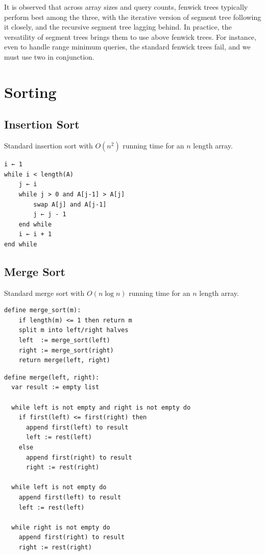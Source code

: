 \documentclass[12pt]{article}
\begin{document}
It is observed that across array sizes and query counts, fenwick trees typically perform best among the three, with the iterative version of segment tree following it closely, and the recursive segment tree lagging behind.  
In practice, the versatility of segment trees brings them to use above fenwick trees. For instance, even to handle range minimum queries, the standard fenwick trees fail, and we must use two in conjunction.\cite{fenwick_tree_rmq}


\section{Sorting}\label{sec:sorting-detail}

\subsection{Insertion Sort\cite{insertion_sort_wiki}}
Standard insertion sort with $O(n^2)$ running time for an $n$ length array.
\begin{verbatim}
i ← 1
while i < length(A)
    j ← i
    while j > 0 and A[j-1] > A[j]
        swap A[j] and A[j-1]
        j ← j - 1
    end while
    i ← i + 1
end while
\end{verbatim}

\subsection{Merge Sort\cite{merge_sort_wiki}}
Standard merge sort with $O(n\log n)$ running time for an $n$ length array.
\begin{verbatim}
define merge_sort(m):
    if length(m) <= 1 then return m
    split m into left/right halves
    left  := merge_sort(left)
    right := merge_sort(right)
    return merge(left, right)
\end{verbatim}

\begin{verbatim}
define merge(left, right):
  var result := empty list

  while left is not empty and right is not empty do
    if first(left) <= first(right) then
      append first(left) to result
      left := rest(left)
    else
      append first(right) to result
      right := rest(right)

  while left is not empty do
    append first(left) to result
    left := rest(left)

  while right is not empty do
    append first(right) to result
    right := rest(right)
\end{verbatim}
\end{document}

